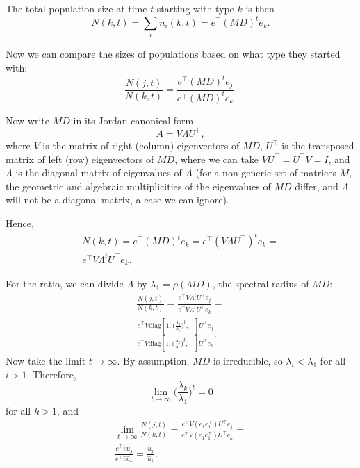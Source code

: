 \documentclass[12pt, twocolumn]{extarticle}
\newcommand*{\tr}{^\intercal}
\newcommand{\matrx}[1]{{\left[ \stackrel{}{#1}\right]}}
\newcommand{\diag}[1]{\mbox{diag}\matrx{#1}}
\newcommand{\goesto}{\rightarrow}
\begin{document}
The total population size at time $t$ starting with type $k$ is then
\begin{equation}
N(k,t) = \sum_i{n_i(k,t)} = e\tr (MD)^t e_k.
\end{equation}

Now we can compare the sizes of populations based on what type they started
with:
\begin{equation}
\frac{N(j,t)}{N(k,t)} = 
\frac{e\tr (MD)^t e_j}{e\tr (MD)^t e_k}.
\end{equation}

Now write $MD$ in its Jordan canonical form 
\begin{equation}
A = V \Lambda U\tr,
\end{equation}
where $V$ is the matrix of right (column) eigenvectors of $MD$,
$U\tr$ is the transposed matrix of left (row) eigenvectors of $MD$,
where we can take $V U\tr = U\tr V = I$, 
and $\Lambda$ is the diagonal matrix of eigenvalues of $A$ 
(for a non-generic set of matrices $M$, the geometric and algebraic multiplicities of the eigenvalues of $MD$ differ, and $\Lambda$ will not be a diagonal matrix, a case we can ignore).

Hence,
\begin{multline}
N(k, t) = 
e\tr (MD)^t e_k =
e\tr  (V \Lambda U\tr)^t e_k = \\
e\tr V \Lambda^t U\tr e_k.
\end{multline}

For the ratio, we can divide $\Lambda$ by $\lambda_1 = \rho(MD)$,
the spectral radius of $MD$:
\begin{multline}
\frac{N(j,t)}{N(k,t)} =
\frac{ e\tr V \Lambda^t U\tr e_j}{ e\tr V \Lambda^t U\tr e_k} = \\
\frac{ e\tr V \diag{1, \Big(\frac{\lambda_2}{\lambda_1}\Big)^t, \cdots} U\tr e_j} { e\tr V \diag{1,\Big(\frac{\lambda_2}{\lambda_1}\Big)^t, \cdots} U\tr e_k}.
\end{multline}
Now take the limit $t \goesto \infty$.
By assumption, $MD$ is irreducible, so $\lambda_i < \lambda_1$ for all $i > 1$.
Therefore,
\begin{equation}
\lim_{t \goesto \infty} \Big( \frac{\lambda_k}{\lambda_1} \Big)^t = 0
\end{equation}
for all $k > 1$, and
\begin{equation}
\begin{aligned}
\lim_{t \goesto \infty}\frac{N(j,t)}{N(k,t)} = 
\frac{e\tr V (e_1 e_1\tr) U\tr e_j} { e\tr V (e_1 e_1\tr) U\tr e_k} = \\
\frac{ e\tr \hat v \hat u_j} { e\tr \hat v  \hat u_k} =
\frac{\hat u_j} {\hat u_k}.
\end{aligned}
\end{equation}
\end{document}
